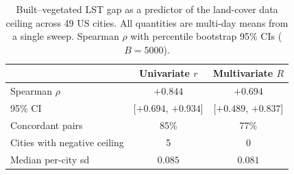 \begin{table}[ht]
  \centering
  \caption{Built--vegetated LST gap as a predictor of the land-cover
  data ceiling across 49 US cities. All quantities are multi-day
  means from a single sweep. Spearman $\rho$ with percentile
  bootstrap 95\% CIs ($B=5000$).}
  \label{tab:gap_dual}
  \small
  \begin{tabular}{lcc}
    \toprule
    & Univariate $r$ & Multivariate $R$ \\
    \midrule
    Spearman $\rho$ & $+0.844$ & $+0.694$ \\
    95\% CI & [$+0.694$, $+0.934$] & [$+0.489$, $+0.837$] \\
    Concordant pairs & 85\% & 77\% \\
    Cities with negative ceiling & 5 & 0 \\
    Median per-city sd & $0.085$ & $0.081$ \\
    \bottomrule
  \end{tabular}
\end{table}

